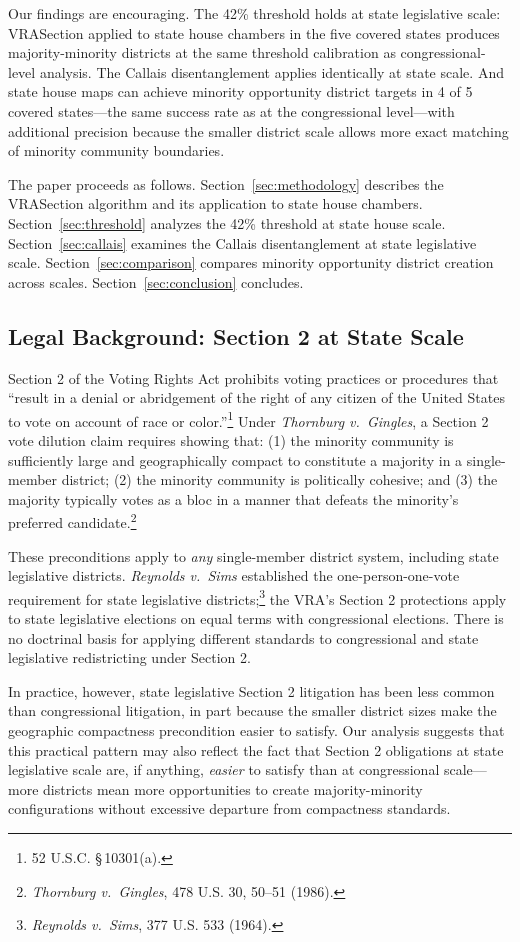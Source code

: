 Our findings are encouraging. The 42\% threshold holds at state legislative scale: VRASection applied to state house chambers in the five covered states produces majority-minority districts at the same threshold calibration as congressional-level analysis. The Callais disentanglement applies identically at state scale. And state house maps can achieve minority opportunity district targets in 4 of 5 covered states---the same success rate as at the congressional level---with additional precision because the smaller district scale allows more exact matching of minority community boundaries.

The paper proceeds as follows. Section~\ref{sec:methodology} describes the VRASection algorithm and its application to state house chambers. Section~\ref{sec:threshold} analyzes the 42\% threshold at state house scale. Section~\ref{sec:callais} examines the Callais disentanglement at state legislative scale. Section~\ref{sec:comparison} compares minority opportunity district creation across scales. Section~\ref{sec:conclusion} concludes.

\subsection{Legal Background: Section 2 at State Scale}

Section 2 of the Voting Rights Act prohibits voting practices or procedures that ``result in a denial or abridgement of the right of any citizen of the United States to vote on account of race or color.''\footnote{52 U.S.C. \S\,10301(a).} Under \textit{Thornburg v.\ Gingles}, a Section 2 vote dilution claim requires showing that: (1) the minority community is sufficiently large and geographically compact to constitute a majority in a single-member district; (2) the minority community is politically cohesive; and (3) the majority typically votes as a bloc in a manner that defeats the minority's preferred candidate.\footnote{\textit{Thornburg v.\ Gingles}, 478 U.S. 30, 50--51 (1986).}

These preconditions apply to \textit{any} single-member district system, including state legislative districts. \textit{Reynolds v.\ Sims} established the one-person-one-vote requirement for state legislative districts;\footnote{\textit{Reynolds v.\ Sims}, 377 U.S. 533 (1964).} the VRA's Section 2 protections apply to state legislative elections on equal terms with congressional elections. There is no doctrinal basis for applying different standards to congressional and state legislative redistricting under Section 2.

In practice, however, state legislative Section 2 litigation has been less common than congressional litigation, in part because the smaller district sizes make the geographic compactness precondition easier to satisfy. Our analysis suggests that this practical pattern may also reflect the fact that Section 2 obligations at state legislative scale are, if anything, \textit{easier} to satisfy than at congressional scale---more districts mean more opportunities to create majority-minority configurations without excessive departure from compactness standards.
